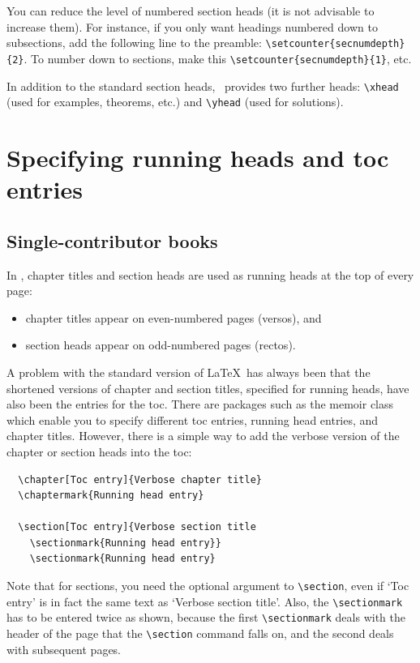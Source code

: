 You can reduce the level of numbered section heads (it is not advisable to increase them). For instance, if you only want headings numbered down to subsections, add the following line to the preamble: \verb"\setcounter{secnumdepth}{2}". To number down to sections, make this \verb"\setcounter{secnumdepth}{1}", etc.

In addition to the standard section heads, \cambridge\ provides two further heads: \verb"\xhead" (used for examples, theorems, etc.) and \verb"\yhead" (used for solutions).


\section{Specifying running heads and toc entries}

\subsection{Single-contributor books}
\label{singlecontributor}

In \cambridge, chapter titles and section heads are used as running heads at the top of every page:
\begin{itemize}
\item chapter titles appear on even-numbered pages (versos), and
\item section heads appear on odd-numbered pages (rectos).
\end{itemize}
A problem with the standard version of \LaTeX\ has always been that the shortened versions of chapter and section titles, specified for running heads, have also been the entries for the toc. There are packages such as the memoir class which enable you to specify different toc entries, running head entries, and chapter titles. However, there is a simple way to add the verbose version of the chapter or section heads into the toc:
\begin{verbatim}
  \chapter[Toc entry]{Verbose chapter title}
  \chaptermark{Running head entry}

  \section[Toc entry]{Verbose section title
    \sectionmark{Running head entry}}
    \sectionmark{Running head entry}
\end{verbatim}
Note that for sections, you need the optional argument to \verb"\section", even if `Toc entry' is in fact the same text as `Verbose section title'. Also, the \verb"\sectionmark" has to be entered twice as shown, because the first \verb"\sectionmark" deals with the header of the page that the \verb"\section" command falls on, and the second deals with subsequent pages.

